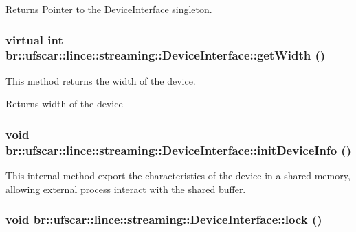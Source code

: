 \begin{DoxyReturn}{Returns}
Pointer to the \hyperlink{classbr_1_1ufscar_1_1lince_1_1streaming_1_1DeviceInterface}{DeviceInterface} singleton. 
\end{DoxyReturn}
\hypertarget{classbr_1_1ufscar_1_1lince_1_1streaming_1_1DeviceInterface_a37072d863c297b69afebfb4f53516a95}{
\subsubsection[{getWidth}]{\setlength{\rightskip}{0pt plus 5cm}virtual int br::ufscar::lince::streaming::DeviceInterface::getWidth ()}}
\label{classbr_1_1ufscar_1_1lince_1_1streaming_1_1DeviceInterface_a37072d863c297b69afebfb4f53516a95}


This method returns the width of the device. 

\begin{DoxyReturn}{Returns}
width of the device 
\end{DoxyReturn}
\hypertarget{classbr_1_1ufscar_1_1lince_1_1streaming_1_1DeviceInterface_ae83c57ed7c71e480f596e21a64a6559f}{
\subsubsection[{initDeviceInfo}]{\setlength{\rightskip}{0pt plus 5cm}void br::ufscar::lince::streaming::DeviceInterface::initDeviceInfo ()}}
\label{classbr_1_1ufscar_1_1lince_1_1streaming_1_1DeviceInterface_ae83c57ed7c71e480f596e21a64a6559f}


This internal method export the characteristics of the device in a shared memory, allowing external process interact with the shared buffer. 

\hypertarget{classbr_1_1ufscar_1_1lince_1_1streaming_1_1DeviceInterface_a409c99b4d2a758d775bde989ca9e97be}{
\subsubsection[{lock}]{\setlength{\rightskip}{0pt plus 5cm}void br::ufscar::lince::streaming::DeviceInterface::lock ()}}
\label{classbr_1_1ufscar_1_1lince_1_1streaming_1_1DeviceInterface_a409c99b4d2a758d775bde989ca9e97be}


